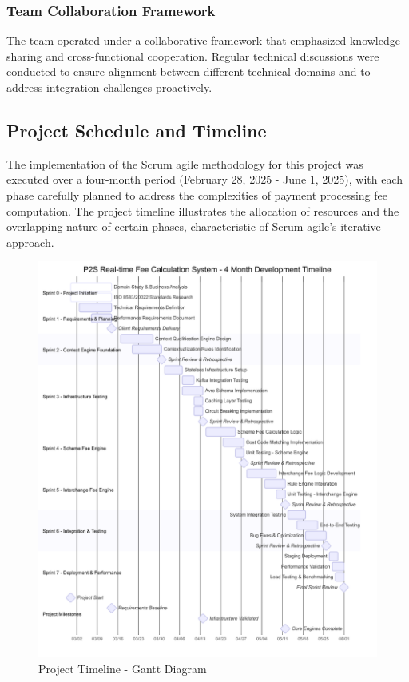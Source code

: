 \subsubsection{Team Collaboration Framework}

The team operated under a collaborative framework that emphasized knowledge sharing and cross-functional cooperation. Regular technical discussions were conducted to ensure alignment between different technical domains and to address integration challenges proactively.

\subsection{Project Schedule and Timeline}

The implementation of the Scrum agile methodology for this project was executed over a four-month period (February 28, 2025 - June 1, 2025), with each phase carefully planned to address the complexities of payment processing fee computation. The project timeline illustrates the allocation of resources and the overlapping nature of certain phases, characteristic of Scrum agile's iterative approach.

\begin{figure}[H]
    \centering
    \includegraphics[width=\textwidth]{img/gantt.png}
    \caption{Project Timeline - Gantt Diagram}
    \label{fig:gantt}
\end{figure}

